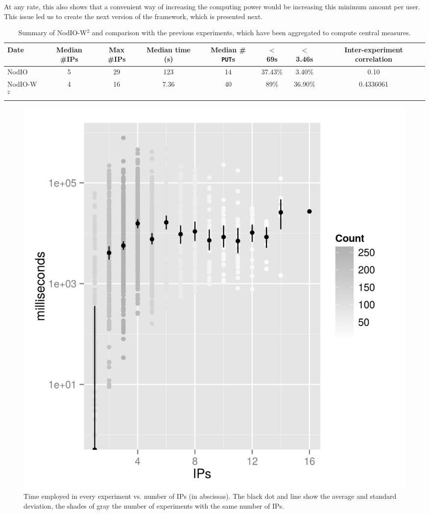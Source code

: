 \documentclass[journal,onecolumn]{IEEEtran}
\begin{document}
At any rate, this also shows that a convenient way of increasing the
computing power would be increasing this minimum amount per user. This
issue led us to create the next version of the framework, which is
presented next. %

\begin{table}[!htb]
\caption{Summary of {\sf NodIO-W$^2$} and comparison with the previous
  experiments, which have been aggregated to compute central measures. \label{tab:summary:ww}}
\begin{center}
\begin{tabular}{l|ccccccc}
\hline
Date & Median \#IPs & Max \#IPs & Median time (s) & Median \#{\tt
  PUT}s & $<$ 69s & $<$ 3.46s & Inter-experiment correlation\\
\hline
{\sf NodIO} & 5 & 29 & 123 & 14 & 37.43\% & 3.40\% & 0.10 \\
{\sf NodIO-W$^2$} & 4  & 16 & 7.36 & 40 & 89\% & 36.90\% & 0.4336061 \\
\hline
\end{tabular}
\end{center}
\end{table}
%
\begin{figure}[!htb]
\centering
\includegraphics[width=0.9\linewidth]{ips-time-ww.png}
\caption{Time employed in every experiment vs. number of IPs (in
  abscissas). The black dot and line show the average and standard
  deviation, the shades of gray the number of experiments with the same
  number of IPs. } 
\label{fig:ipstime:w2}
\end{figure}
\end{document}
